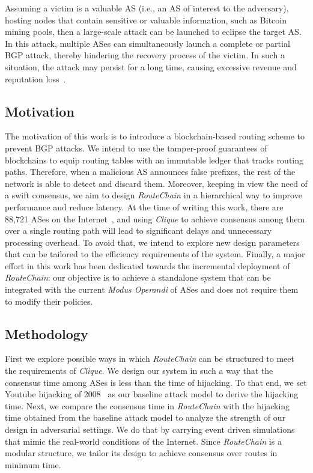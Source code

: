 \documentclass[5p]{elsarticle}
\newcommand{\rc}{{{\em RouteChain}}\xspace}
\begin{document}
Assuming a victim is a valuable AS (i.e., an AS of interest to the adversary), hosting nodes that contain sensitive or valuable information, such as Bitcoin mining pools, then a large-scale attack can be launched to eclipse the target AS. In this attack, multiple ASes can simultaneously launch a complete or partial BGP attack, thereby hindering the recovery process of the victim. In such a situation, the attack may persist for a long time, causing excessive revenue and reputation loss~\cite{BangeraG11}.



\subsection{Motivation}\label{sec:motivation}
The motivation of this work is to introduce a blockchain-based routing scheme to prevent BGP attacks. We intend to use the tamper-proof guarantees of blockchains to equip routing tables with an immutable ledger that tracks routing paths. Therefore, when a malicious AS announces false prefixes, the rest of the network is able to detect and discard them. Moreover, keeping in view the need of a swift consensus, we aim to design \rc in a hierarchical way to improve performance and reduce latency. At the time of writing this work, there are 88,721 ASes on the Internet~\cite{RIR-18}, and using {\em Clique} to achieve consensus among them over a single routing path will lead to significant delays and unnecessary processing overhead. To avoid that, we intend to explore new design parameters that can be tailored to the efficiency requirements of the system.  Finally, a major effort in this work has been dedicated towards the incremental deployment of \rc: our objective is to achieve a standalone system that can be integrated with the current {\em Modus Operandi} of ASes and does not require them to modify their policies. 


\subsection{Methodology}\label{sec:method}
First we explore possible ways in which \rc can be structured to meet the requirements of {\em Clique}. We design our system in such a way that the consensus time among ASes is less than the time of hijacking. To that end, we set Youtube hijacking of 2008~\cite{GoldbergS14} as our baseline attack model to derive the hijacking time. Next, we compare the consensus time in \rc with the hijacking time obtained from the baseline attack model to analyze the strength of our design in adversarial settings. We do that by carrying event driven simulations that mimic the real-world conditions of the Internet. Since \rc is a modular structure, we tailor its design to achieve consensus over routes in minimum time. 
\end{document}
